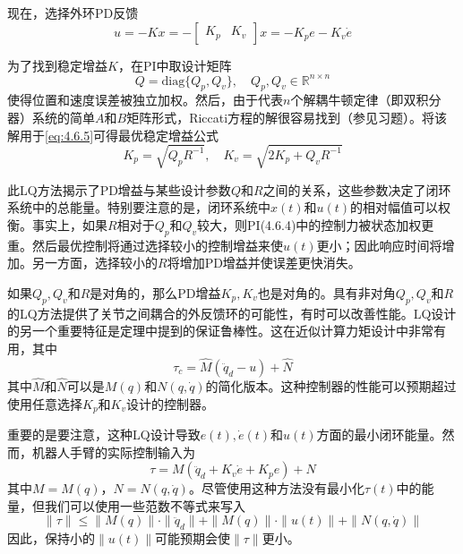 \documentclass[UTF8]{ctexart}
\theoremstyle{definition}
\begin{document}
现在，选择外环PD反馈
\begin{equation}\label{eq:4.6.14}
    u = -Kx = -\begin{bmatrix} K_p & K_v \end{bmatrix}x = -K_pe - K_v\dot{e}
\end{equation}

为了找到稳定增益$K$，在PI中取设计矩阵
\begin{equation*}
    Q = \mathrm{diag}\{Q_p, Q_v\}, \quad Q_p, Q_v \in \mathbb{R}^{n \times n}
\end{equation*}
使得位置和速度误差被独立加权。然后，由于代表$n$个解耦牛顿定律（即双积分器）系统的简单$A$和$B$矩阵形式，Riccati方程的解很容易找到（参见习题）。将该解用于\eqref{eq:4.6.5}可得最优稳定增益公式
\begin{equation}\label{eq:4.6.15}
    K_p = \sqrt{Q_p R^{-1}}, \quad K_v = \sqrt{2K_p + Q_v R^{-1}}
\end{equation}

此LQ方法揭示了PD增益与某些设计参数$Q$和$R$之间的关系，这些参数决定了闭环系统中的总能量。特别要注意的是，闭环系统中$x(t)$和$u(t)$的相对幅值可以权衡。事实上，如果$R$相对于$Q_p$和$Q_v$较大，则PI(4.6.4)中的控制力被状态加权更重。然后最优控制将通过选择较小的控制增益来使$u(t)$更小；因此响应时间将增加。另一方面，选择较小的$R$将增加PD增益并使误差更快消失。

如果$Q_p, Q_v$和$R$是对角的，那么PD增益$K_p, K_v$也是对角的。具有非对角$Q_p, Q_v$和$R$的LQ方法提供了关节之间耦合的外反馈环的可能性，有时可以改善性能。LQ设计的另一个重要特征是定理中提到的保证鲁棒性。这在近似计算力矩设计中非常有用，其中
\begin{equation}\label{eq:4.6.16}
    \tau_c = \hat{M} (\ddot{q}_d - u) + \hat{N}
\end{equation}
其中$\hat{M}$和$\hat{N}$可以是$M(q)$和$N(q, \dot{q})$的简化版本。这种控制器的性能可以预期超过使用任意选择$K_p$和$K_v$设计的控制器。

重要的是要注意，这种LQ设计导致$e(t), \dot{e}(t)$和$u(t)$方面的最小闭环能量。然而，机器人手臂的实际控制输入为
\begin{equation}\label{eq:4.6.17}
    \tau = M (\ddot{q}_d + K_v\dot{e} + K_pe) + N
\end{equation}
其中$M=M(q)$，$N=N(q,\dot{q})$。尽管使用这种方法没有最小化$\tau(t)$中的能量，但我们可以使用一些范数不等式来写入
\begin{equation}\label{eq:4.6.18}
    \|\tau\| \leq \|M(q)\| \cdot \|\ddot{q}_d\| + \|M(q)\| \cdot \|u(t)\| + \|N(q, \dot{q})\|
\end{equation}
因此，保持小的$\|u(t)\|$可能预期会使$\|\tau\|$更小。
\end{document}
